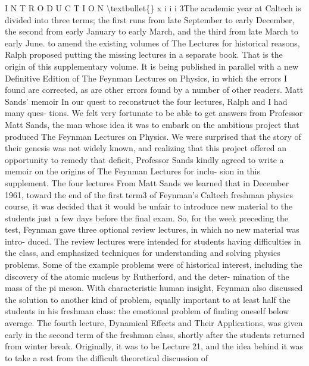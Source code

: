 \documentclass[10pt,oneside]{article}
\begin{document}
I N T R O D U C T I O N \textbackslash{}textbullet\{\} x i i i 3The academic year at Caltech is divided into three terms; the first runs from late September to early December, the second from early January to early March, and the third from late March to early June. to amend the existing volumes of The Lectures for historical reasons, Ralph proposed putting the missing lectures in a separate book. That is the origin of this supplementary volume. It is being published in parallel with a new Definitive Edition of The Feynman Lectures on Physics, in which the errors I found are corrected, as are other errors found by a number of other readers. Matt Sands’ memoir In our quest to reconstruct the four lectures, Ralph and I had many ques- tions. We felt very fortunate to be able to get answers from Professor Matt Sands, the man whose idea it was to embark on the ambitious project that produced The Feynman Lectures on Physics. We were surprised that the story of their genesis was not widely known, and realizing that this project offered an opportunity to remedy that deficit, Professor Sands kindly agreed to write a memoir on the origins of The Feynman Lectures for inclu- sion in this supplement. The four lectures From Matt Sands we learned that in December 1961, toward the end of the first term3 of Feynman’s Caltech freshman physics course, it was decided that it would be unfair to introduce new material to the students just a few days before the final exam. So, for the week preceding the test, Feynman gave three optional review lectures, in which no new material was intro- duced. The review lectures were intended for students having difficulties in the class, and emphasized techniques for understanding and solving physics problems. Some of the example problems were of historical interest, including the discovery of the atomic nucleus by Rutherford, and the deter- mination of the mass of the pi meson. With characteristic human insight, Feynman also discussed the solution to another kind of problem, equally important to at least half the students in his freshman class: the emotional problem of finding oneself below average. The fourth lecture, Dynamical Effects and Their Applications, was given early in the second term of the freshman class, shortly after the students returned from winter break. Originally, it was to be Lecture 21, and the idea behind it was to take a rest from the difficult theoretical discussion of\par
\end{document}
